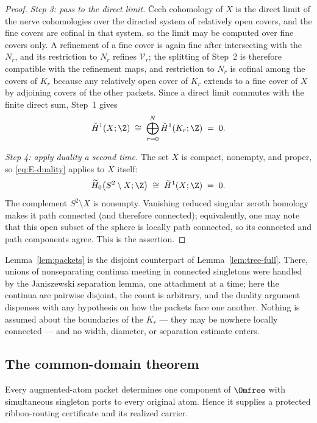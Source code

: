 \begin{proof}
\emph{Step 3: pass to the direct limit.}
\v{C}ech cohomology of $X$ is the direct limit of the nerve cohomologies over the
directed system of relatively open covers, and the fine covers are cofinal in that
system, so the limit may be computed over fine covers only. A refinement of a fine
cover is again fine after intersecting with the $N_r$, and its restriction to $N_r$
refines $\mathcal V_r$; the splitting of Step~2 is therefore compatible with the
refinement maps, and restriction to $N_r$ is cofinal among the covers of $K_r$
because any relatively open cover of $K_r$ extends to a fine cover of $X$ by
adjoining covers of the other packets. Since a direct limit commutes with the finite
direct sum, Step~1 gives
\[
\check H^1(X;\Z)\;\cong\;\bigoplus_{r=0}^{N}\check H^1(K_r;\Z)\;=\;0 .
\]

\emph{Step 4: apply duality a second time.}
The set $X$ is compact, nonempty, and proper, so \eqref{eq:E-duality} applies to $X$
itself:
\[
\widetilde H_0\bigl(S^2\setminus X;\Z\bigr)\;\cong\;\check H^1(X;\Z)\;=\;0 .
\]
The complement $S^2\setminus X$ is nonempty.  Vanishing reduced singular
zeroth homology makes it path connected (and therefore connected); equivalently,
one may note that this open subset of the sphere is locally path connected, so
its connected and path components agree.  This is the assertion.
\end{proof}

Lemma~\ref{lem:packets} is the disjoint counterpart of
Lemma~\ref{lem:tree-full}. There, unions of nonseparating continua meeting in
connected singletons were handled by the Janiszewski separation lemma, one attachment
at a time; here the continua are pairwise disjoint, the count is arbitrary, and the
duality argument dispenses with any hypothesis on how the packets face one another.
Nothing is assumed about the boundaries of the $K_r$ --- they may be nowhere locally
connected --- and no width, diameter, or separation estimate enters.

\subsection{The common-domain theorem}\label{subsec:E-common}

\begin{theorem}\label{thm:common-domain}
Every augmented-atom packet determines one component of $\Omfree$ with simultaneous
singleton ports to every original atom.  Hence it supplies a protected
ribbon-routing certificate and its realized carrier.
\end{theorem}

